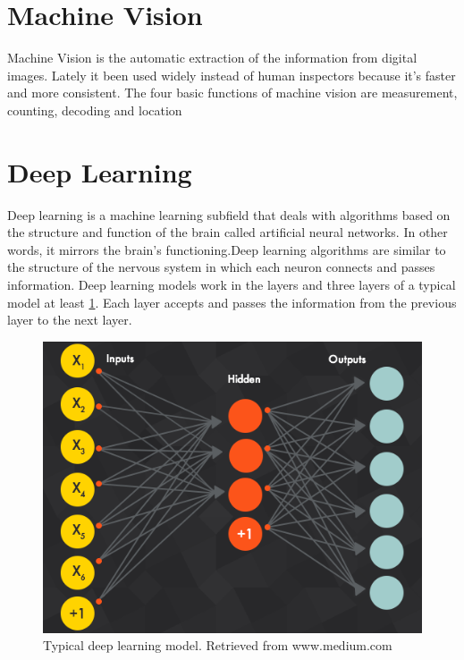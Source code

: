 \documentclass[12pt]{report}
\begin{document}
\clearpage
\section{Machine Vision}
    Machine Vision is the automatic extraction of the information from digital images.
    Lately it been used widely instead of human inspectors because it's faster and more consistent.
    The four basic functions of machine vision are measurement, counting, decoding and location


\clearpage
\section{Deep Learning}
    Deep learning is a machine learning subfield that deals with algorithms based 
    on the structure and function of the brain called artificial neural networks. 
    In other words, it mirrors the brain's functioning.Deep learning algorithms are similar to the structure of 
    the nervous system in which each neuron connects and passes information.
    Deep learning models work in the layers and three layers of a typical model at least \ref{fig:deep_learining}. 
    Each layer accepts and passes the information from the previous layer to the next layer.

    \begin{figure} [h]
        \centering
        \includegraphics[width=\textwidth]{./images/deep_learning.png}
        \caption{Typical deep learning model. Retrieved from www.medium.com}
        \label{fig:deep_learining}
    \end{figure}
\end{document}
